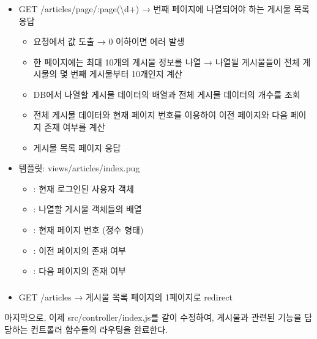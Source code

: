 \subsubsection*{}
\begin{itemize}
    \item GET /articles/page/:page(\textbackslash{}d+) → 번째 페이지에 나열되어야 하는 게시물 목록 응답
    \begin{itemize}
        \item 요청에서  값 도출 → 0 이하이면  에러 발생
        \item 한 페이지에는 최대 10개의 게시물 정보를 나열 → 나열될 게시물들이 전체 게시물의 몇 번째 게시물부터 10개인지 계산
        \item DB에서 나열할 게시물 데이터의 배열과 전체 게시물 데이터의 개수를 조회
        \item 전체 게시물 데이터와 현재 페이지 번호를 이용하여 이전 페이지와 다음 페이지 존재 여부를 계산
        \item 게시물 목록 페이지 응답
    \end{itemize}
    \item 템플릿: views/articles/index.pug
    \begin{itemize}
        \item {}: 현재 로그인된 사용자 객체
        \item {}: 나열할 게시물 객체들의 배열
        \item {}: 현재 페이지 번호 (정수 형태)
        \item {}: 이전 페이지의 존재 여부
        \item {}: 다음 페이지의 존재 여부
    \end{itemize}
\end{itemize}

\subsubsection*{}
\begin{itemize}
    \item GET /articles → 게시물 목록 페이지의 1페이지로 redirect
\end{itemize}

마지막으로, 이제 src/controller/index.js를 \와 같이 수정하여, 게시물과 관련된 기능을 담당하는 컨트롤러 함수들의 라우팅을 완료한다.

